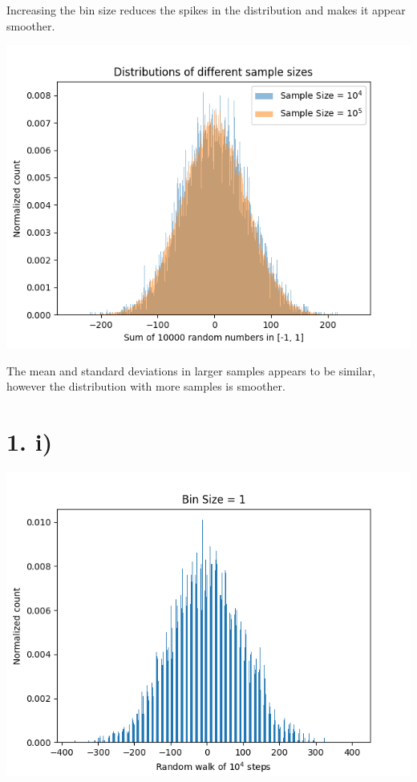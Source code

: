 \documentclass{article}
\begin{document}
Increasing the bin size reduces the spikes in the distribution and makes it appear smoother.

\begin{center}
    \includegraphics[scale=0.8]{1h_sample.png}        
\end{center}

The mean and standard deviations in larger samples appears to be similar, however the distribution with more samples is smoother.

\section*{1. i)}

\begin{center}
    \includegraphics[scale=0.8]{1ij_dx_1.png}
\end{center}
\end{document}
